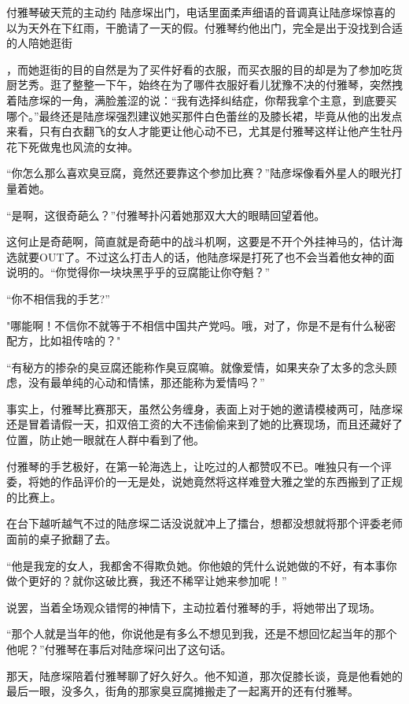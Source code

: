 \documentclass[11pt,a4paper]{article}
\begin{document}
付雅琴破天荒的主动约 陆彦堔出门，电话里面柔声细语的音调真让陆彦堔惊喜的以为天外在下红雨，干脆请了一天的假。付雅琴约他出门，完全是出于没找到合适的人陪她逛街﻿﻿

，而她逛街的目的自然是为了买件好看的衣服，而买衣服的目的却是为了参加吃货厨艺秀。逛了整整一下午，始终在为了哪件衣服好看儿犹豫不决的付雅琴，突然拽着陆彦堔的一角，满脸羞涩的说：“我有选择纠结症，你帮我拿个主意，到底要买哪个。”最终还是陆彦堔强烈建议她买那件白色蕾丝的及膝长裙，毕竟从他的出发点来看，只有白衣翻飞的女人才能更让他心动不已，尤其是付雅琴这样让他产生牡丹花下死做鬼也风流的女神。﻿﻿

“你怎么那么喜欢臭豆腐，竟然还要靠这个参加比赛？”陆彦堔像看外星人的眼光打量着她。﻿﻿

“是啊，这很奇葩么？”付雅琴扑闪着她那双大大的眼睛回望着他。﻿﻿

这何止是奇葩啊，简直就是奇葩中的战斗机啊，这要是不开个外挂神马的，估计海选就要OUT了。不过这么打击人的话，他陆彦堔是打死了也不会当着他女神的面说明的。“你觉得你一块块黑乎乎的豆腐能让你夺魁？”﻿﻿

“你不相信我的手艺?”﻿﻿

"哪能啊！不信你不就等于不相信中国共产党吗。哦，对了，你是不是有什么秘密配方，比如祖传啥的？"﻿

“有秘方的掺杂的臭豆腐还能称作臭豆腐嘛。就像爱情，如果夹杂了太多的念头顾虑，没有最单纯的心动和情愫，那还能称为爱情吗？”﻿﻿

事实上，付雅琴比赛那天，虽然公务缠身，表面上对于她的邀请模棱两可，陆彦堔还是冒着请假一天，扣双倍工资的大不违偷偷来到了她的比赛现场，而且还藏好了位置，防止她一眼就在人群中看到了他。﻿﻿

付雅琴的手艺极好，在第一轮海选上，让吃过的人都赞叹不已。唯独只有一个评委，将她的作品评价的一无是处，说她竟然将这样难登大雅之堂的东西搬到了正规的比赛上。﻿﻿

在台下越听越气不过的陆彦堔二话没说就冲上了擂台，想都没想就将那个评委老师面前的桌子掀翻了去。﻿﻿

“他是我宠的女人，我都舍不得欺负她。你他娘的凭什么说她做的不好，有本事你做个更好的？就你这破比赛，我还不稀罕让她来参加呢！”﻿

说罢，当着全场观众错愕的神情下，主动拉着付雅琴的手，将她带出了现场。﻿﻿

“那个人就是当年的他，你说他是有多么不想见到我，还是不想回忆起当年的那个他呢？”付雅琴在事后对陆彦堔问出了这句话。﻿﻿

那天，陆彦堔陪着付雅琴聊了好久好久。他不知道，那次促膝长谈，竟是他看她的最后一眼，没多久，街角的那家臭豆腐摊搬走了一起离开的还有付雅琴。﻿﻿
\end{document}
